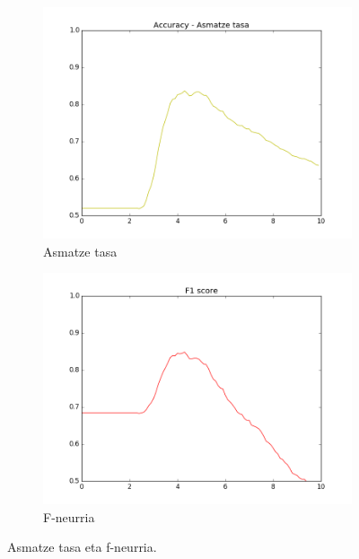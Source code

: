 \documentclass[information,article,submit,moreauthors,pdftex,10pt,a4paper]{Definitions/mdpi}
\begin{document}
\begin{figure}[H]
  \centering
  \begin{subfigure}[b]{0.48\linewidth}
    \includegraphics[width=\linewidth]{accuracy}
    \caption{Asmatze tasa}
    \label{fig:acc}
  \end{subfigure}
  \begin{subfigure}[b]{0.48\linewidth}
    \includegraphics[width=\linewidth]{fmeasure}
    \caption{F-neurria}
    \label{fig:f1}
  \end{subfigure}
  \caption{Asmatze tasa eta f-neurria.}
  \label{fig:acc f1}
\end{figure}
\end{document}
